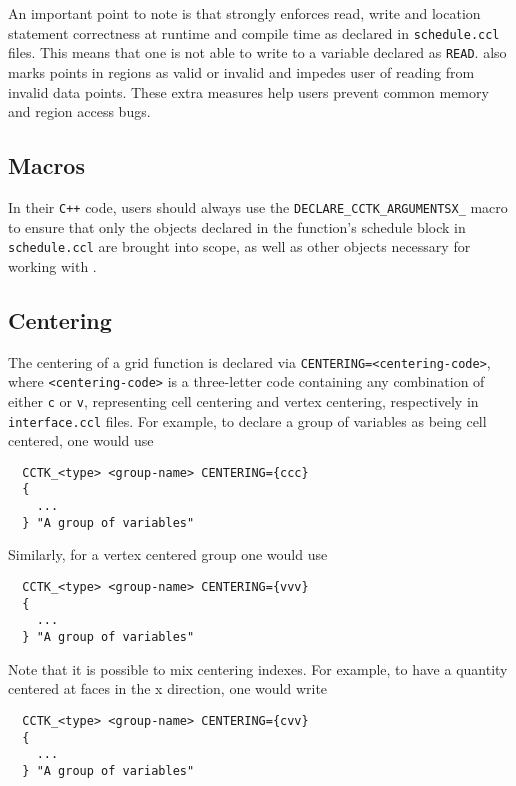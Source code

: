 An important point to note is that \CarpetX\space strongly enforces read, write and location statement correctness at runtime and compile time as declared in \texttt{schedule.ccl} files. This means that one is not able to write to a variable declared as \texttt{READ}. \CarpetX\space also marks points in regions as valid or invalid and impedes user of reading from invalid data points. These extra measures help users prevent common memory and region access bugs. 

\subsection{Macros}

In their \texttt{C++} code, users should always use the \texttt{DECLARE\_CCTK\_ARGUMENTSX\_<scheduled function name>} macro to ensure that only the objects declared in the function's schedule block in \texttt{schedule.ccl} are brought into scope, as well as other objects necessary for working with \CarpetX.

 \subsection{Centering}

The centering of a grid function is declared via \texttt{CENTERING={<centering-code>}}, where \texttt{<centering-code>} is a three-letter code containing any combination of either \texttt{c} or \texttt{v}, representing cell centering and vertex centering, respectively in \texttt{interface.ccl} files. For example, to declare a group of variables as being cell centered, one would use
%
\begin{lstlisting}
  CCTK_<type> <group-name> CENTERING={ccc}
  {
    ...
  } "A group of variables"
\end{lstlisting}

Similarly, for a vertex centered group one would use
%
\begin{lstlisting}
  CCTK_<type> <group-name> CENTERING={vvv}
  {
    ...
  } "A group of variables"
\end{lstlisting}

Note that it is possible to mix centering indexes. For example, to have a quantity centered at faces in the x direction, one would write
%
\begin{lstlisting}
  CCTK_<type> <group-name> CENTERING={cvv}
  {
    ...
  } "A group of variables"
\end{lstlisting}

